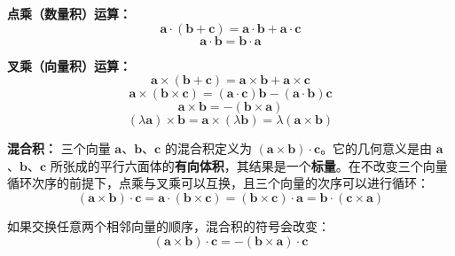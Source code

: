 \textbf{点乘（数量积）运算：}
\begin{equation}
	\boldsymbol{a}\cdot(\boldsymbol{b}+\boldsymbol{c})=\boldsymbol{a}\cdot\boldsymbol{b}+\boldsymbol{a}\cdot\boldsymbol{c}
	\label{eq:向量运算:点乘分配率}
\end{equation}
\begin{equation}
	\boldsymbol{a}\cdot\boldsymbol{b}=\boldsymbol{b}\cdot\boldsymbol{a}
	\label{eq:向量运算:点乘交换律}
\end{equation}

\textbf{叉乘（向量积）运算：}
\begin{equation}
	\boldsymbol{a}\times(\boldsymbol{b}+\boldsymbol{c})=\boldsymbol{a}\times\boldsymbol{b}+\boldsymbol{a}\times\boldsymbol{c}
	\label{eq:向量运算:叉乘分配率}
\end{equation}
\begin{equation}
	\boldsymbol{a}\times(\boldsymbol{b}\times\boldsymbol{c})=(\boldsymbol{a}\cdot\boldsymbol{c})\boldsymbol{b}-(\boldsymbol{a}\cdot\boldsymbol{b})\boldsymbol{c}
	\label{eq:向量运算:双重向量积}
\end{equation}
\begin{equation}
	\boldsymbol{a}\times\boldsymbol{b}=-(\boldsymbol{b}\times\boldsymbol{a})
	\label{eq:向量运算:叉乘反交换}
\end{equation}
\begin{equation}
	(\lambda\boldsymbol{a})\times\boldsymbol{b}=\boldsymbol{a}\times(\lambda\boldsymbol{b})=\lambda(\boldsymbol{a}\times\boldsymbol{b})
	\label{eq:向量运算:叉乘数乘}
\end{equation}

\textbf{混合积：} 三个向量 $\boldsymbol{a}$、$\boldsymbol{b}$、$\boldsymbol{c}$ 的混合积定义为 $(\boldsymbol{a}\times\boldsymbol{b})\cdot\boldsymbol{c}$。它的几何意义是由 $\boldsymbol{a}$、$\boldsymbol{b}$、$\boldsymbol{c}$ 所张成的平行六面体的\textbf{有向体积}，其结果是一个\textbf{标量}。在不改变三个向量循环次序的前提下，点乘与叉乘可以互换，且三个向量的次序可以进行循环：
\begin{equation}
	(\boldsymbol{a}\times\boldsymbol{b})\cdot\boldsymbol{c}
	=\boldsymbol{a}\cdot(\boldsymbol{b}\times\boldsymbol{c})
	=(\boldsymbol{b}\times\boldsymbol{c})\cdot\boldsymbol{a}
	=\boldsymbol{b}\cdot(\boldsymbol{c}\times\boldsymbol{a})
	\label{eq:向量运算:混合积循环}
\end{equation}

如果交换任意两个相邻向量的顺序，混合积的符号会改变：
\begin{equation}
	(\boldsymbol{a}\times\boldsymbol{b})\cdot\boldsymbol{c}=-(\boldsymbol{b}\times\boldsymbol{a})\cdot\boldsymbol{c}
	\label{eq:向量运算:混合积换序}
\end{equation}

